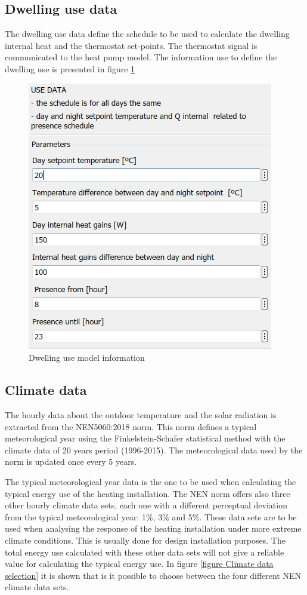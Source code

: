 \subsection{Dwelling use data}
\label{Dwelling use data}

The dwelling use data define the schedule to be used to calculate the dwelling internal heat and the thermostat set-points. The thermostat signal is communicated to the heat pump model. The information use to define the dwelling use is presented in figure \ref{figure:Dwelling info}


\begin{figure}[H]
	\centering
	\includegraphics[width=0.8\columnwidth]{Pictures/Dwelling use model information.png}
	\caption[Short title]{Dwelling use model information}
	\label{figure:Dwelling info}
\end{figure}
\newpage
\subsection{Climate data}
\label{climatedata}
The hourly data about the outdoor temperature and the solar radiation is extracted from the NEN5060:2018 norm. This norm defines a typical meteorological year using the Finkelstein-Schafer statistical method with the climate data of 20 years period (1996-2015). The meteorological data used by the norm is updated once every 5 years.  

The typical meteorological year data is the one to be used when calculating the typical energy use of the heating installation. The NEN norm offers also three other hourly climate data sets, each one with a different perceptual deviation from the typical meteorological year: 1\%, 3\% and 5\%. These data sets are to be used when analysing the response of the heating installation under more extreme climate conditions. This is usually done for design installation purposes. The total energy use calculated with these other data sets will not give a reliable value for calculating the typical energy use.  In figure \ref{figure Climate data selection} it is shown that is it possible to choose between the four different NEN climate data sets. 

